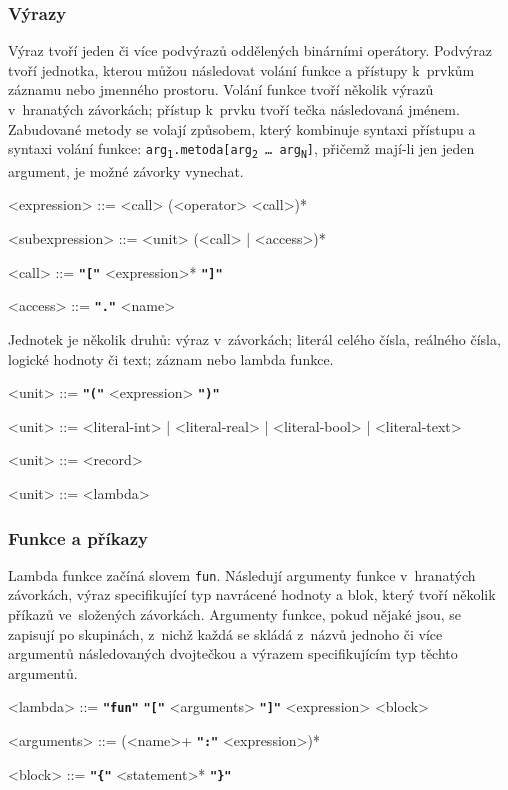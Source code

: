 \documentclass[a4paper,12pt]{article}
\def\quote #1{"#1"}
\def\emphasis #1{\textbf{\texttt{\quote{#1}}}}
\begin{document}
\subsubsection{Výrazy}
Výraz tvoří jeden či více podvýrazů oddělených binárními operátory. Podvýraz tvoří jednotka, kterou můžou následovat volání funkce a přístupy k~prvkům záznamu nebo jmenného prostoru. Volání funkce tvoří několik výrazů v~hranatých závorkách; přístup k~prvku tvoří tečka následovaná jménem. Zabudované metody se volají způsobem, který kombinuje syntaxi přístupu a syntaxi volání funkce: \texttt{arg\textsubscript{1}.metoda[arg\textsubscript{2} \ldots{} arg\textsubscript{N}]}, přičemž mají-li jen jeden argument, je možné závorky vynechat.
\begin{grammar}
<expression> ::= <call> (<operator> <call>)*

<subexpression> ::= <unit> (<call> | <access>)*

<call> ::= \emphasis{[} <expression>* \emphasis{]}

<access> ::= \emphasis{.} <name>
\end{grammar}

Jednotek je několik druhů: výraz v~závorkách; literál celého čísla, reálného čísla, logické hodnoty či text; záznam nebo lambda funkce.
\begin{grammar}
<unit> ::= \emphasis{(} <expression> \emphasis{)}

<unit> ::= <literal-int> | <literal-real> | <literal-bool> | <literal-text>

<unit> ::= <record>

<unit> ::= <lambda>
\end{grammar}

\subsubsection{Funkce a příkazy}
Lambda funkce začíná slovem \texttt{fun}. Následují argumenty funkce v~hranatých závorkách, výraz specifikující typ navrácené hodnoty a blok, který tvoří několik příkazů ve~složených závorkách. Argumenty funkce, pokud nějaké jsou, se zapisují po skupinách, z~nichž každá se skládá z~názvů jednoho či více argumentů následovaných dvojtečkou a výrazem specifikujícím typ těchto argumentů.
\begin{grammar}
<lambda> ::= \emphasis{fun} \emphasis{[} <arguments> \emphasis{]} <expression> <block>

<arguments> ::= (<name>+ \emphasis{:} <expression>)*

<block> ::= \emphasis{\{} <statement>* \emphasis{\}}
\end{grammar}
\end{document}
